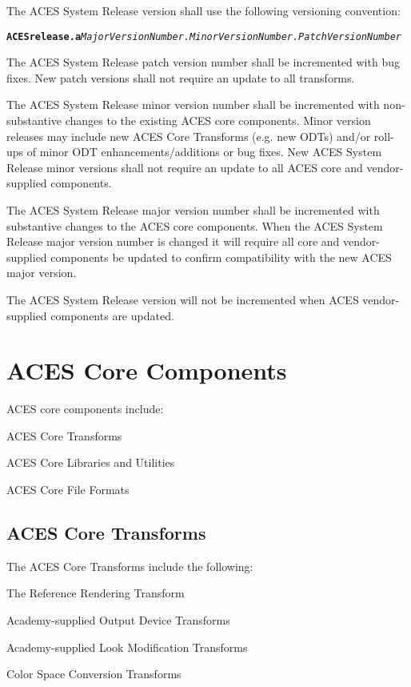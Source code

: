The ACES System Release version shall use the following versioning convention: 

\texttt{\textbf{ACESrelease.a}\textit{MajorVersionNumber.MinorVersionNumber.PatchVersionNumber}}

The ACES System Release patch version number shall be incremented with bug fixes. New patch versions shall not require an update to all transforms.

The ACES System Release minor version number shall be incremented with non-substantive changes to the existing ACES core components. Minor version releases may include new ACES Core Transforms (e.g. new ODTs) and/or roll-ups of minor ODT enhancements/additions or bug fixes. New ACES System Release minor versions shall not require an update to all ACES core and vendor-supplied components.

The ACES System Release major version number shall be incremented with substantive changes to the ACES core components. When the ACES System Release major version number is changed it will require all core and vendor-supplied components be updated to confirm compatibility with the new ACES major version.

The ACES System Release version will not be incremented when ACES vendor-supplied components are updated.

\section{ACES Core Components}
ACES core components include: 

\begin{listize}[-]
	\item ACES Core Transforms
	\item ACES Core Libraries and Utilities
	\item ACES Core File Formats
\end{listize}

\subsection{ACES Core Transforms}
The ACES Core Transforms include the following:

\begin{listize}[-]
	\item The Reference Rendering Transform
	\item Academy-supplied Output Device Transforms
	\item Academy-supplied Look Modification Transforms
	\item Color Space Conversion Transforms
\end{listize}

